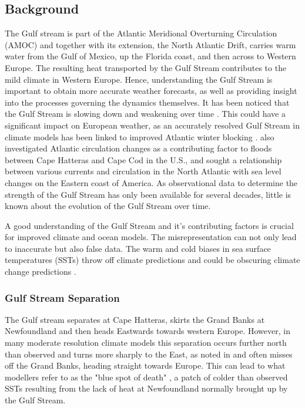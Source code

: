 \documentclass[a4paper,11pt]{article}
\begin{document}
\subsection{Background}
The Gulf stream is part of the Atlantic Meridional Overturning Circulation (AMOC) and together with its extension, the North Atlantic Drift, carries warm water from the Gulf of Mexico, up the Florida coast, and then across to Western Europe. The resulting heat transported by the Gulf Stream contributes to the mild climate in Western Europe. Hence, understanding the Gulf Stream is important to obtain more accurate weather forecasts, as well as providing insight into the processes governing the dynamics themselves. It has been noticed that the Gulf Stream is slowing down and weakening over time \citep{Greatbatch1991}. This could have a significant impact on European weather, as an accurately resolved Gulf Stream in climate models has been linked to improved Atlantic winter blocking \citep{Scaife2011a}. \citep{Ezer2015} also investigated Atlantic circulation changes as a contributing factor to floods between Cape Hatteras and Cape Cod in the U.S., and sought a relationship between various currents and circulation in the North Atlantic with sea level changes on the Eastern coast of America. As observational data to determine the strength of the Gulf Stream has only been available for several decades, little is known about the evolution of the Gulf Stream over time. 

A good understanding of the Gulf Stream and it's contributing factors is crucial for improved climate and ocean models. The misrepresentation can not only lead to inaccurate but also false data. The warm and cold biases in sea surface temperatures (SSTs) throw off climate predictions and could be obscuring climate change predictions \citep{Saba2016}.


\subsubsection{Gulf Stream Separation}

The Gulf stream separates at Cape Hatteras, skirts the Grand Banks at Newfoundland and then heads Eastwards towards western Europe. However, in many moderate resolution climate models this separation occurs further north than observed and turns more sharply to the East, as noted in \citep{Hurlburt2008} and often misses off the Grand Banks, heading straight towards Europe. This can lead to what modellers refer to as the "blue spot of death" \citep{Gnanadesikan2007}, a patch of colder than observed SSTs resulting from the lack of heat at Newfoundland normally brought up by the Gulf Stream.
\end{document}
